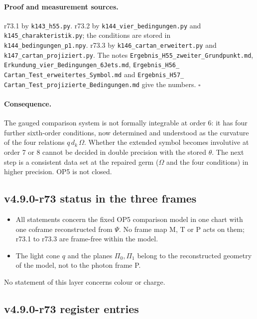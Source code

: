 \paragraph{Proof and measurement sources.}
r73.1 by \texttt{k143\_h55.py}.  r73.2 by \texttt{k144\_vier\_bedingungen.py} and \texttt{k145\_charakteristik.py}; the
conditions are stored in \texttt{k144\_bedingungen\_p1.npy}.  r73.3 by \texttt{k146\_cartan\_erweitert.py} and
\texttt{k147\_cartan\_projiziert.py}.  The notes \texttt{Ergebnis\_H55\_\allowbreak zweiter\_\allowbreak Grundpunkt.md},
\texttt{Erkundung\_\allowbreak vier\_\allowbreak Bedingungen\_\allowbreak 6Jets.md}, \texttt{Ergebnis\_H56\_\allowbreak
Cartan\_\allowbreak Test\_\allowbreak erweitertes\_\allowbreak Symbol.md} and \texttt{Ergebnis\_H57\_\allowbreak
Cartan\_\allowbreak Test\_\allowbreak projizierte\_\allowbreak Bedingungen.md} give the numbers.  \(\square\)

\paragraph{Consequence.}
The gauged comparison system is not formally integrable at order 6: it has four further sixth-order conditions, now
determined and understood as the curvature of the four relations \(q\,d_k\,\Omega\).  Whether the extended symbol becomes
involutive at order 7 or 8 cannot be decided in double precision with the stored \(\theta\).  The next step is a consistent
data set at the repaired germ (\(\Omega\) and the four conditions) in higher precision.  OP5 is not closed.

\subsection*{v4.9.0-r73 status in the three frames}
\label{subsec:v490-r73-frames}

\begin{itemize}[leftmargin=2em]
\item All statements concern the fixed OP5 comparison model in one chart with one coframe reconstructed from \(\Psi\).  No frame
map M, T or P acts on them; r73.1 to r73.3 are frame-free within the model.
\item The light cone \(q\) and the planes \(\Pi_0,\Pi_1\) belong to the reconstructed geometry of the model, not to the photon
frame P.
\end{itemize}
No statement of this layer concerns colour or charge.

\subsection*{v4.9.0-r73 register entries}
\label{subsec:v490-r73-register}

